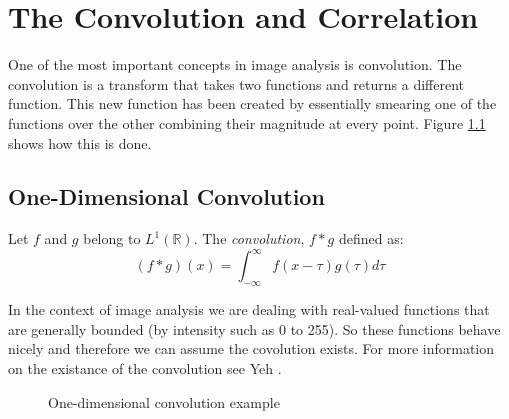 \chapter{The Convolution and Correlation}
	One of the most important concepts in image analysis is convolution. The convolution is a transform that takes two functions and returns a different function. This new function has been created by essentially smearing one of the functions over the other combining their magnitude at every point. Figure \ref{fig_convolution} shows how this is done.

\section{One-Dimensional Convolution}

	\begin{dfn}
		Let $f$ and $g$ belong to $L^1(\mathbb{R})$. The \emph{convolution}, $f*g$ defined as:
		\begin{equation}\label{def_convolve_1D}
			(f*g)(x)=\int_{-\infty}^\infty f(x-\tau)g(\tau)d\tau
		\end{equation}
	\end{dfn}

	In the context of image analysis we are dealing with real-valued functions that are generally bounded (by intensity such as 0 to 255). So these functions behave nicely and therefore we can assume the covolution exists. For more information on the existance of the convolution see Yeh \cite{yeh_1}.

	\begin{figure}[!htb]
			\centering
			\caption{One-dimensional convolution example}
			\label{fig_convolution}
	\end{figure}
	\clearpage
	
